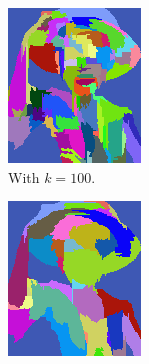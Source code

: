 \begin{figure}[htb!]
\begin{subfigure}{.3\textwidth}
\includegraphics[width=\textwidth]{images/luffyK100.png}
\caption{With $k = 100$.}
\label{fig:smallKSegmentation}
\end{subfigure}
\begin{subfigure}{.3\textwidth}
\includegraphics[width=\textwidth]{images/luffyK1000.png}

\end{subfigure}
\end{figure}
